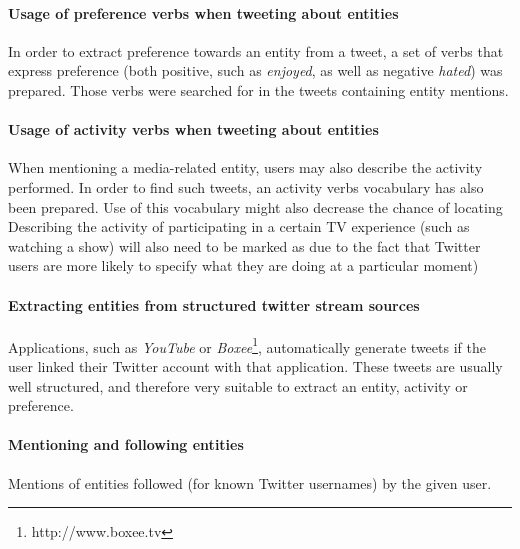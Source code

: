 \paragraph{Usage of preference verbs when tweeting about entities}
In order to extract preference towards an entity from a tweet, a set of verbs
that express preference (both positive, such as \textit{enjoyed}, as well as negative \textit{hated})
was prepared. Those verbs were searched for in the tweets containing entity mentions.
\paragraph{Usage of activity verbs when tweeting about entities}
When mentioning a media-related entity, users may also describe the activity performed.
In order to find such tweets, an activity verbs vocabulary has also been prepared. Use of this vocabulary
might also decrease the chance of locating
Describing the activity of participating in a certain TV experience (such
as watching a show) will also need to be marked as due to the
fact that Twitter users are more likely to specify what they are doing at a
particular moment)
\paragraph{Extracting entities from structured twitter stream sources}
Applications, such as \textit{YouTube} or \textit{Boxee}\footnote[1]{http://www.boxee.tv}, automatically generate tweets
if the user linked their Twitter account with that application. These tweets are
usually well structured, and therefore very suitable to extract an entity, activity or preference.
\paragraph{Mentioning and following entities}
Mentions of entities followed (for known Twitter usernames) by the given user.

